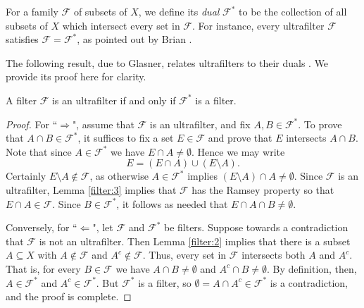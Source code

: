 For a family \( \mathcal{F}  \) of subsets of \( X \), we define its \emph{dual} \( \mathcal{F} ^{\ast}  \) to be the collection of all subsets of \( X \) which intersect every set in \( \mathcal{F}  \). For instance, every ultrafilter \( \mathcal{F}  \) satisfies \( \mathcal{F} = \mathcal{F} ^{\ast}  \), as pointed out by Brian \cite{brian:2016}.

The following result, due to Glasner, relates ultrafilters to their duals \cite{glasner:1980}. We provide its proof here for clarity.

\begin{lemma}
\label{filter:4}
A filter \( \mathcal{F}  \) is an ultrafilter if and only if \( \mathcal{F} ^{\ast}  \) is a filter.
\end{lemma}
\begin{proof}
	For ``$\Rightarrow$", assume that \( \mathcal{F}  \) is an ultrafilter, and fix \( A,B \in \mathcal{F} ^{\ast}  \). To prove that \( A \cap B \in \mathcal{F} ^{\ast}  \), it suffices to fix a set \( E \in \mathcal{F}  \) and prove that \( E \) intersects \( A \cap B \). Note that since \( A \in \mathcal{F} ^{\ast}  \) we have \( E \cap A \neq \emptyset  \). Hence we may write \[ E = (E \cap A) \cup (E \setminus A). \] Certainly \( E \setminus A \notin \mathcal{F}  \), as otherwise \( A \in \mathcal{F} ^{\ast}  \) implies \( (E\setminus A) \cap A \neq \emptyset \). Since \( \mathcal{F}  \) is an ultrafilter, Lemma \ref{filter:3} implies that \( \mathcal{F}  \) has the Ramsey property so that \( E \cap A \in \mathcal{F}  \). Since \( B \in \mathcal{F} ^{\ast}  \), it follows as needed that \( E \cap A \cap B \neq \emptyset  \).

	Conversely, for ``$\Leftarrow$", let \( \mathcal{F}  \) and \( \mathcal{F} ^{\ast}  \) be filters. Suppose towards a contradiction that \( \mathcal{F}  \) is not an ultrafilter. Then Lemma \ref{filter:2} implies that there is a subset \( A \subseteq X \) with \( A \notin \mathcal{F}  \) and \( A^{c} \notin \mathcal{F}  \). Thus, every set in \( \mathcal{F}  \) intersects both \( A \) and \( A^{c}  \). That is, for every \( B \in \mathcal{F}  \) we have \( A \cap B \neq \emptyset  \) and \( A^{c} \cap B \neq \emptyset  \). By definition, then, \( A \in \mathcal{F}^{\ast}   \) and \( A^{c} \in \mathcal{F} ^{\ast}  \). But \( \mathcal{F} ^{\ast}  \) is a filter, so \( \emptyset = A \cap A^{c} \in \mathcal{F} ^{\ast}  \) is a contradiction, and the proof is complete.
\end{proof}

